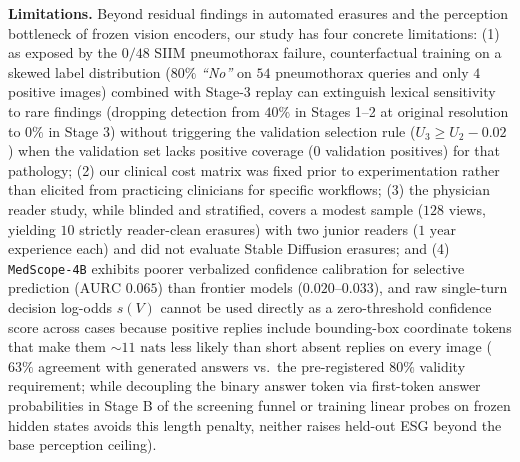 \documentclass{article} %
\begin{document}
\textbf{Limitations.} Beyond residual findings in automated erasures and the perception bottleneck of frozen vision encoders, our study has four concrete limitations: (1) as exposed by the $0/48$ SIIM pneumothorax failure, counterfactual training on a skewed label distribution ($80\%$ \emph{``No''} on $54$ pneumothorax queries and only $4$ positive images) combined with Stage-3 replay can extinguish lexical sensitivity to rare findings (dropping detection from $40\%$ in Stages 1--2 at original resolution to $0\%$ in Stage 3) without triggering the validation selection rule ($U_3 \ge U_2 - 0.02$) when the validation set lacks positive coverage ($0$ validation positives) for that pathology; (2) our clinical cost matrix was fixed prior to experimentation rather than elicited from practicing clinicians for specific workflows; (3) the physician reader study, while blinded and stratified, covers a modest sample ($128$ views, yielding $10$ strictly reader-clean erasures) with two junior readers ($1\text{ year}$ experience each) and did not evaluate Stable Diffusion erasures; and (4) \texttt{MedScope-4B} exhibits poorer verbalized confidence calibration for selective prediction ($\text{AURC } 0.065$) than frontier models ($0.020\text{--}0.033$), and raw single-turn decision log-odds $s(V)$ cannot be used directly as a zero-threshold confidence score across cases because positive replies include bounding-box coordinate tokens that make them $\sim 11\text{ nats}$ less likely than short absent replies on every image ($63\%$ agreement with generated answers vs.\ the pre-registered $80\%$ validity requirement; while decoupling the binary answer token via first-token answer probabilities in Stage B of the screening funnel or training linear probes on frozen hidden states avoids this length penalty, neither raises held-out ESG beyond the base perception ceiling).
\end{document}
